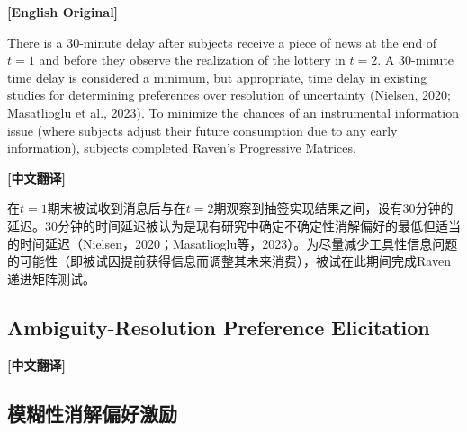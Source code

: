 \documentclass[12pt,a4paper]{ctexart}
\newenvironment{original}{%
  \par\medskip\noindent\textbf{[English Original]}\par\smallskip
  \color{black}\small
}{%
  \par\medskip
}
\newenvironment{translation}{%
  \par\noindent\textbf{[中文翻译]}\par\smallskip
  \color{blue}\small
}{%
  \par\bigskip
}
\theoremstyle{definition}
\theoremstyle{remark}
\begin{document}
\begin{original}
There is a 30-minute delay after subjects receive a piece of news at the end of $t=1$ and before they observe the realization of the lottery in $t=2$. A 30-minute time delay is considered a minimum, but appropriate, time delay in existing studies for determining preferences over resolution of uncertainty (Nielsen, 2020; Masatlioglu et al., 2023). To minimize the chances of an instrumental information issue (where subjects adjust their future consumption due to any early information), subjects completed Raven's Progressive Matrices.
\end{original}
\begin{translation}
在$t=1$期末被试收到消息后与在$t=2$期观察到抽签实现结果之间，设有30分钟的延迟。30分钟的时间延迟被认为是现有研究中确定不确定性消解偏好的最低但适当的时间延迟（Nielsen，2020；Masatlioglu等，2023）。为尽量减少工具性信息问题的可能性（即被试因提前获得信息而调整其未来消费），被试在此期间完成Raven递进矩阵测试。
\end{translation}

\subsection{Ambiguity-Resolution Preference Elicitation}
\begin{translation}
\subsection*{模糊性消解偏好激励}
\end{translation}
\end{document}
